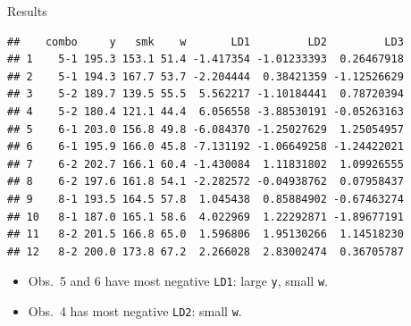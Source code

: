 \begin{frame}[fragile]{Results}

\begin{knitrout}\footnotesize
{}\color{fgcolor}\begin{kframe}
\begin{alltt}
\end{alltt}
\begin{verbatim}
##    combo     y   smk    w       LD1         LD2         LD3
## 1    5-1 195.3 153.1 51.4 -1.417354 -1.01233393  0.26467918
## 2    5-1 194.3 167.7 53.7 -2.204444  0.38421359 -1.12526629
## 3    5-2 189.7 139.5 55.5  5.562217 -1.10184441  0.78720394
## 4    5-2 180.4 121.1 44.4  6.056558 -3.88530191 -0.05263163
## 5    6-1 203.0 156.8 49.8 -6.084370 -1.25027629  1.25054957
## 6    6-1 195.9 166.0 45.8 -7.131192 -1.06649258 -1.24422021
## 7    6-2 202.7 166.1 60.4 -1.430084  1.11831802  1.09926555
## 8    6-2 197.6 161.8 54.1 -2.282572 -0.04938762  0.07958437
## 9    8-1 193.5 164.5 57.8  1.045438  0.85884902 -0.67463274
## 10   8-1 187.0 165.1 58.6  4.022969  1.22292871 -1.89677191
## 11   8-2 201.5 166.8 65.0  1.596806  1.95130266  1.14518230
## 12   8-2 200.0 173.8 67.2  2.266028  2.83002474  0.36705787
\end{verbatim}
\end{kframe}
\end{knitrout}
  
  \begin{itemize}
\item Obs.\ 5 and 6 have most negative \texttt{LD1}: large \texttt{y},
  small \texttt{w}.
\item Obs.\ 4 has most negative \texttt{LD2}: small \texttt{w}.
\end{itemize}

\end{frame}

